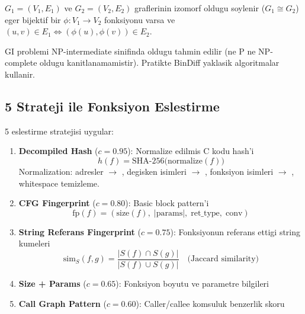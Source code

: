 \begin{tanim}
$G_1 = (V_1, E_1)$ ve $G_2 = (V_2, E_2)$ graflerinin izomorf
oldugu soylenir ($G_1 \cong G_2$) eger bijektif bir $\phi: V_1 \to V_2$
fonksiyonu varsa ve $(u, v) \in E_1 \iff (\phi(u), \phi(v)) \in E_2$.
\end{tanim}

GI problemi NP-intermediate sinifinda oldugu tahmin edilir
(ne P ne NP-complete oldugu kanitlanamamistir). Pratikte BinDiff
yaklasik algoritmalar kullanir.

\subsection{5 Strateji ile Fonksiyon Eslestirme}

 5 eslestirme stratejisi uygular:

\begin{enumerate}
  \item \textbf{Decompiled Hash} ($c = 0.95$): Normalize edilmis C kodu hash'i
  \begin{equation}
    h(f) = \text{SHA-256}\bigl(\text{normalize}(f)\bigr)
    \label{eq:decompiled-hash}
  \end{equation}
  Normalization: adresler $\to$ , degisken isimleri $\to$ ,
  fonksiyon isimleri $\to$ , whitespace temizleme.

  \item \textbf{CFG Fingerprint} ($c = 0.80$): Basic block pattern'i
  \begin{equation}
    \text{fp}(f) = (\text{size}(f),\; |\text{params}|,\; \text{ret\_type},\; \text{conv})
    \label{eq:cfg-fingerprint}
  \end{equation}

  \item \textbf{String Referans Fingerprint} ($c = 0.75$): Fonksiyonun
        referans ettigi string kumeleri
  \begin{equation}
    \text{sim}_S(f, g) = \frac{|S(f) \cap S(g)|}{|S(f) \cup S(g)|}
    \quad \text{(Jaccard similarity)}
    \label{eq:string-jaccard}
  \end{equation}

  \item \textbf{Size + Params} ($c = 0.65$): Fonksiyon boyutu ve parametre bilgileri

  \item \textbf{Call Graph Pattern} ($c = 0.60$): Caller/callee komsuluk
        benzerlik skoru
\end{enumerate}

